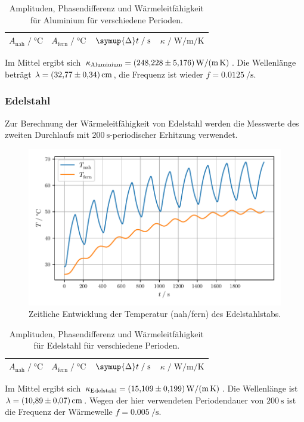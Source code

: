 \begin{table}[H]
     \centering
     \caption{Amplituden, Phasendifferenz und Wärmeleitfähigkeit für Aluminium für verschiedene Perioden.}
     \label{tab:aluminium}
     \begin{tabular}{c c c c}
      \toprule
      $A_\text{nah} \;/\; \si{\celsius}$ &
      $A_\text{fern} \;/\; \si{\celsius}$ &
      $\symup{\Delta}t \;/\; \si{\second}$ &
      $\kappa \;/\; \si{\watt\per\meter\per\kelvin}$ \\
      \midrule
      
      \bottomrule
     \end{tabular}
\end{table}

Im Mittel ergibt sich $\kappa_\text{Aluminium} = \SI{248.228 \pm 5.176}{\watt\per\meter\per\kelvin}$.
Die Wellenlänge beträgt $\lambda = \SI{32.77 \pm 0.34}{\centi\meter}$,
die Frequenz ist wieder $f = \SI{0.0125}{\per\second}$.


\subsubsection{Edelstahl}

Zur Berechnung der Wärmeleitfähigkeit von Edelstahl werden die Messwerte des zweiten Durchlaufs mit
$\SI{200}{\second}$-periodischer Erhitzung verwendet.

\begin{figure}[H]
  \centering
  \includegraphics{build/plot_dynamisch_edelstahl.pdf}
  \caption{Zeitliche Entwicklung der Temperatur (nah/fern) des Edelstahlstabs.}
  \label{fig:dynamisch_edelstahl}
\end{figure}

\begin{table}[H]
     \centering
     \caption{Amplituden, Phasendifferenz und Wärmeleitfähigkeit für Edelstahl für verschiedene Perioden.}
     \label{tab:edelstahl}
     \begin{tabular}{c c c c}
      \toprule
      $A_\text{nah} \;/\; \si{\celsius}$ &
      $A_\text{fern} \;/\; \si{\celsius}$ &
      $\symup{\Delta}t \;/\; \si{\second}$ &
      $\kappa \;/\; \si{\watt\per\meter\per\kelvin}$ \\
      \midrule
      
      \bottomrule
     \end{tabular}
\end{table}

Im Mittel ergibt sich $\kappa_\text{Edelstahl} = \SI{15.109 \pm 0.199}{\watt\per\meter\per\kelvin}$.
Die Wellenlänge ist $\lambda = \SI{10.89 \pm 0.07}{\centi\meter}$.
Wegen der hier verwendeten Periodendauer von $\SI{200}{\second}$ ist die Frequenz der Wärmewelle $f = \SI{0.005}{\per\second}$.
